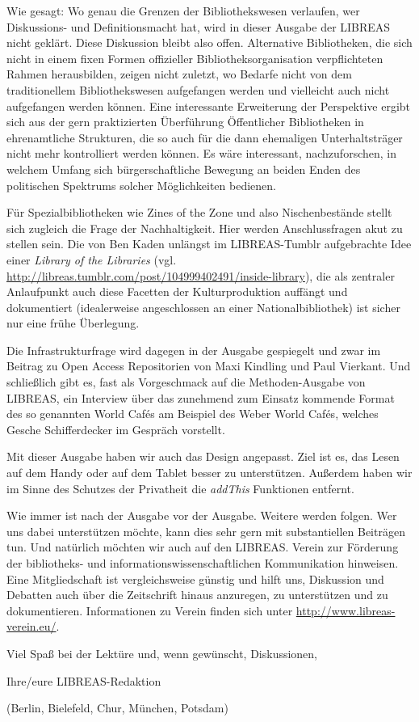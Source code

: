 \documentclass[a4paper,
fontsize=11pt,
oneside,
numbers=noperiodatend,
parskip=half-,
bibliography=totoc,
final
]{scrartcl}
\begin{document}
Wie gesagt: Wo genau die Grenzen der Bibliothekswesen verlaufen, wer
Diskussions- und Definitionsmacht hat, wird in dieser Ausgabe der
LIBREAS nicht geklärt. Diese Diskussion bleibt also offen. Alternative
Bibliotheken, die sich nicht in einem fixen Formen offizieller
Bibliotheksorganisation verpflichteten Rahmen herausbilden, zeigen nicht
zuletzt, wo Bedarfe nicht von dem traditionellem Bibliothekswesen
aufgefangen werden und vielleicht auch nicht aufgefangen werden können.
Eine interessante Erweiterung der Perspektive ergibt sich aus der gern
praktizierten Überführung Öffentlicher Bibliotheken in ehrenamtliche
Strukturen, die so auch für die dann ehemaligen Unterhaltsträger nicht
mehr kontrolliert werden können. Es wäre interessant, nachzuforschen, in
welchem Umfang sich bürgerschaftliche Bewegung an beiden Enden des
politischen Spektrums solcher Möglichkeiten bedienen.

Für Spezialbibliotheken wie Zines of the Zone und also Nischenbestände
stellt sich zugleich die Frage der Nachhaltigkeit. Hier werden
Anschlussfragen akut zu stellen sein. Die von Ben Kaden unlängst im
LIBREAS-Tumblr aufgebrachte Idee einer \emph{Library of the Libraries}
(vgl. \url{http://libreas.tumblr.com/post/104999402491/inside-library}),
die als zentraler Anlaufpunkt auch diese Facetten der Kulturproduktion
auffängt und dokumentiert (idealerweise angeschlossen an einer
Nationalbibliothek) ist sicher nur eine frühe Überlegung.

Die Infrastrukturfrage wird dagegen in der Ausgabe gespiegelt und zwar
im Beitrag zu Open Access Repositorien von Maxi Kindling und Paul
Vierkant. Und schließlich gibt es, fast als Vorgeschmack auf die
Methoden-Ausgabe von LIBREAS, ein Interview über das zunehmend zum
Einsatz kommende Format des so genannten World Cafés am Beispiel des
Weber World Cafés, welches Gesche Schifferdecker im Gespräch vorstellt.

Mit dieser Ausgabe haben wir auch das Design angepasst. Ziel ist es, das
Lesen auf dem Handy oder auf dem Tablet besser zu unterstützen. Außerdem
haben wir im Sinne des Schutzes der Privatheit die \emph{addThis}
Funktionen entfernt.

Wie immer ist nach der Ausgabe vor der Ausgabe. Weitere werden folgen.
Wer uns dabei unterstützen möchte, kann dies sehr gern mit
substantiellen Beiträgen tun. Und natürlich möchten wir auch auf den
LIBREAS. Verein zur Förderung der bibliotheks- und
informationswissenschaftlichen Kommunikation hinweisen. Eine
Mitgliedschaft ist vergleichsweise günstig und hilft uns, Diskussion und
Debatten auch über die Zeitschrift hinaus anzuregen, zu unterstützen und
zu dokumentieren. Informationen zu Verein finden sich unter
\url{http://www.libreas-verein.eu/}.

Viel Spaß bei der Lektüre und, wenn gewünscht, Diskussionen,

Ihre/eure LIBREAS-Redaktion

(Berlin, Bielefeld, Chur, München, Potsdam)

\end{document}
